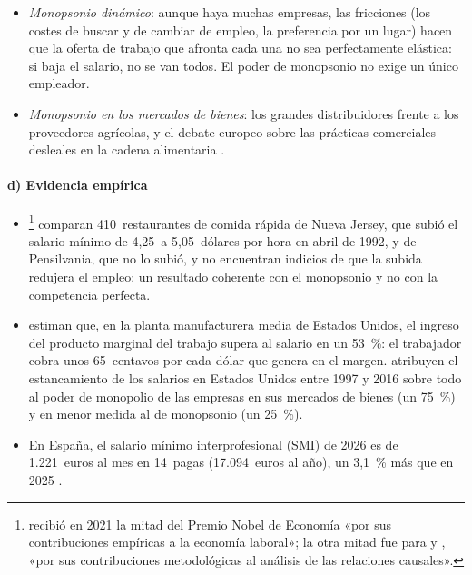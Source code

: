 \documentclass[11pt]{article}
\begin{document}
\begin{itemize}
\item \emph{Monopsonio dinámico}\nocite{Manning2003Monopsony}: aunque haya muchas empresas, las fricciones (los costes de buscar y de cambiar de empleo, la preferencia por un lugar) hacen que la oferta de trabajo que afronta cada una no sea perfectamente elástica: si baja el salario, no se van todos. El poder de monopsonio no exige un único empleador.
\item \emph{Monopsonio en los mercados de bienes}: los grandes distribuidores frente a los proveedores agrícolas, y el debate europeo sobre las prácticas comerciales desleales en la cadena alimentaria .
\end{itemize}

\paragraph{d) Evidencia empírica}

\begin{itemize}
\item \textcite{CardKrueger1994Minimum}\footnote{ recibió en 2021 la mitad del Premio Nobel de Economía «por sus contribuciones empíricas a la economía laboral»; la otra mitad fue para  y , «por sus contribuciones metodológicas al análisis de las relaciones causales»\nocite{Nobel2021CardAngristImbens}.} comparan 410~restaurantes de comida rápida de Nueva Jersey, que subió el salario mínimo de 4,25~a 5,05~dólares por hora en abril de 1992, y de Pensilvania, que no lo subió, y no encuentran indicios de que la subida redujera el empleo: un resultado coherente con el monopsonio y no con la competencia perfecta.
\item \textcite{YehMacalusoHershbein2022Monopsony} estiman que, en la planta manufacturera media de Estados Unidos, el ingreso del producto marginal del trabajo supera al salario en un 53~\%: el trabajador cobra unos 65~centavos por cada dólar que genera en el margen. \textcite{DebEtAl2022Wage} atribuyen el estancamiento de los salarios en Estados Unidos entre 1997 y 2016 sobre todo al poder de monopolio de las empresas en sus mercados de bienes (un 75~\%) y en menor medida al de monopsonio (un 25~\%).
\item En España, el salario mínimo interprofesional (SMI) de 2026 es de 1.221~euros al mes en 14~pagas (17.094~euros al año), un 3,1~\% más que en 2025\nocite{BOE2026SMI} .
\end{itemize}
\end{document}
